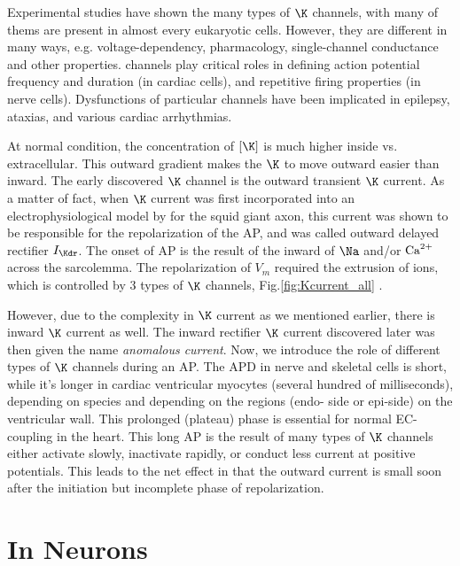 Experimental studies have shown the many types of $\K$ channels, with many of
thems are present in almost every eukaryotic cells. However, they are different
in many ways, e.g. voltage-dependency, pharmacology, single-channel conductance
and other properties.  channels play critical roles in defining action
potential frequency and duration (in cardiac cells), and repetitive firing
properties (in nerve cells). Dysfunctions of particular  channels have
been implicated in epilepsy, ataxias, and various cardiac arrhythmias.

At normal condition, the concentration of $[\K]$ is much higher inside vs.
extracellular. This outward gradient makes the $\K$ to move outward easier than
inward. The early discovered $\K$ channel is the outward transient $\K$ current.
As a matter of fact, when $\K$ current was first incorporated into an
electrophysiological model by \citep{hodgkin1952ap} for the squid giant axon,
this current was shown to be responsible for the repolarization of the AP, and
was called outward delayed rectifier $I_\Kdr$. The onset of AP is the result of
the inward of $\Na$ and/or ${\text{Ca}^{2+}}$ across the sarcolemma. The repolarization of
$V_m$ required the extrusion of ions, which is controlled by 3 types of $\K$
channels, Fig.\ref{fig:Kcurrent_all} \citep{sanguinetti1997}.

However, due to the complexity in $\K$ current as we mentioned earlier, there is
inward $\K$ current as well. The inward rectifier $\K$ current discovered later
was then given the name {\it anomalous current}. Now, we introduce the role of
different types of $\K$ channels during an AP.
The APD in nerve and skeletal cells is short, while it's longer in cardiac
ventricular myocytes (several hundred of milliseconds), depending on species and
depending on the regions (endo- side or epi-side) on the ventricular wall.
This prolonged (plateau) phase is essential for normal EC-coupling in the heart.
This long AP is the result of many types of $\K$ channels either activate
slowly, inactivate rapidly, or conduct less current at positive potentials. This
leads to the net effect in that the outward current is small soon after the
initiation but incomplete phase of repolarization.


\section{In Neurons}

